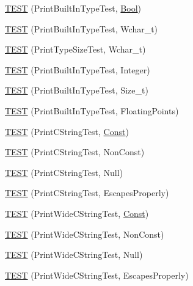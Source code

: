 \begin{DoxyCompactItemize}
\hyperlink{namespacetesting_1_1gtest__printers__test_a6f08c464dc0b8eb822368f552d4467ad}{T\+E\+ST} (Print\+Built\+In\+Type\+Test, \hyperlink{struct_bool}{Bool})
\item 
\hyperlink{namespacetesting_1_1gtest__printers__test_ab567ebd97eff0a4b9a20a5f5cb77d678}{T\+E\+ST} (Print\+Built\+In\+Type\+Test, Wchar\+\_\+t)
\item 
\hyperlink{namespacetesting_1_1gtest__printers__test_a705ec4c2886606a22194107397fceea6}{T\+E\+ST} (Print\+Type\+Size\+Test, Wchar\+\_\+t)
\item 
\hyperlink{namespacetesting_1_1gtest__printers__test_a278d53e99390c7b31ff531524fe5e86e}{T\+E\+ST} (Print\+Built\+In\+Type\+Test, Integer)
\item 
\hyperlink{namespacetesting_1_1gtest__printers__test_a991dc124d153742c3ca126b2fa9ccab5}{T\+E\+ST} (Print\+Built\+In\+Type\+Test, Size\+\_\+t)
\item 
\hyperlink{namespacetesting_1_1gtest__printers__test_acde0b28d177604ddb5e185d7b107f6f7}{T\+E\+ST} (Print\+Built\+In\+Type\+Test, Floating\+Points)
\item 
\hyperlink{namespacetesting_1_1gtest__printers__test_a6cd47b21ad8d9ac66ba57b5b6415a924}{T\+E\+ST} (Print\+C\+String\+Test, \hyperlink{namespacetesting_a945ac56c5508a3c9c032bbe8aae8dcfa}{Const})
\item 
\hyperlink{namespacetesting_1_1gtest__printers__test_a89d9905fecee1b976c26d35498734dd4}{T\+E\+ST} (Print\+C\+String\+Test, Non\+Const)
\item 
\hyperlink{namespacetesting_1_1gtest__printers__test_ad29b97d58a4d1e5e8dd4d854f66b9e22}{T\+E\+ST} (Print\+C\+String\+Test, Null)
\item 
\hyperlink{namespacetesting_1_1gtest__printers__test_a140030b990011abab91d4c0b59f21edd}{T\+E\+ST} (Print\+C\+String\+Test, Escapes\+Properly)
\item 
\hyperlink{namespacetesting_1_1gtest__printers__test_a4caa1f81979cdc6f5ada95e01a4fae63}{T\+E\+ST} (Print\+Wide\+C\+String\+Test, \hyperlink{namespacetesting_a945ac56c5508a3c9c032bbe8aae8dcfa}{Const})
\item 
\hyperlink{namespacetesting_1_1gtest__printers__test_a8812b5f088e13083ebb8a7e35fbcdae7}{T\+E\+ST} (Print\+Wide\+C\+String\+Test, Non\+Const)
\item 
\hyperlink{namespacetesting_1_1gtest__printers__test_acd1267d49d61ad53b2b8a88f68fca3a7}{T\+E\+ST} (Print\+Wide\+C\+String\+Test, Null)
\item 
\hyperlink{namespacetesting_1_1gtest__printers__test_aa80d6bb47e6bf997dacf0c75322d12cf}{T\+E\+ST} (Print\+Wide\+C\+String\+Test, Escapes\+Properly)

\end{DoxyCompactItemize}
